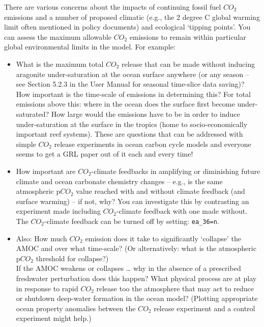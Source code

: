 \documentclass[11pt,fleqn]{book} %
\begin{document}
There are various concerns about the impacts of continuing fossil fuel \(CO_{2}\) emissions and a number of proposed climatic (e.g., the 2 degree C global warming limit often mentioned in policy documents) and ecological ‘tipping points’. You can assess the maximum allowable \(CO_{2}\) emissions to remain within particular global environmental limits in the model. For example:

\begin{itemize}[noitemsep]

\vspace{1mm}
\item What is the maximum total \(CO_{2}\) release that can be made without inducing aragonite under-saturation at the ocean surface anywhere (or any season – see Section 5.2.3 in the User Manual for seasonal time-slice data saving)? How important is the time-scale of emissions in determining this? For total emissions above this: where in the ocean does the surface first become under-saturated? How large would the emissions have to be in order to induce under-saturation at the surface in the tropics (home to socio-economically important reef systems). These are questions that can be addressed with simple \(CO_{2}\) release experiments in ocean carbon cycle models and everyone seems to get a GRL paper out of it each and every time!

\vspace{1mm}
\item How important are \(CO_{2}\)-climate feedbacks in amplifying or diminishing future climate and ocean carbonate chemistry changes – e.g., is the same atmospheric p\(CO_{2}\) value reached with and without climate feedback (and surface warming) – if not, why? You can investigate this by contrasting an experiment made including \(CO_{2}\)-climate feedback with one made without. The \(CO_{2}\)-climate feedback can be turned off by setting: \texttt{ea\_36=n}.

\vspace{1mm}
\item Also: How much \(CO_{2}\) emission does it take to significantly ‘collapse’ the AMOC and over what time-scale? (Or alternatively: what is the atmospheric p\(CO_{2}\) threshold for collapse?) 
\\ If the AMOC weakens or collapses … why in the absence of a prescribed freshwater perturbation does this happen? What physical process are at play in response to rapid \(CO_{2}\) release too the atmosphere that may act to reduce or shutdown deep-water formation in the ocean model? (Plotting appropriate ocean property anomalies between the \(CO_{2}\) release experiment and a control experiment might help.)

\end{itemize}
\end{document}
